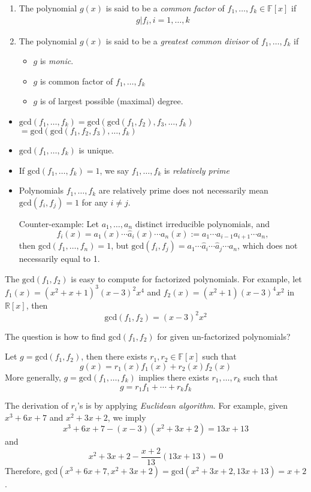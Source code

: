 \begin{definition}
\begin{enumerate}
\item
The polynomial $g(x)$ is said to be a \emph{common factor} of $f_1,\dots,f_k\in\mathbb{F}[x]$ if
\[
\begin{array}{ll}
g|f_i,
i=1,\dots,k
\end{array}
\]
\item
The polynomial $g(x)$ is said to be a \emph{greatest common divisor} of $f_1,\dots,f_k$ if
\begin{itemize}
\item
$g$ is \emph{monic}.
\item
$g$ is common factor of $f_1,\dots,f_k$
\item
$g$ is of largest possible (maximal) degree.
\end{itemize} 
\end{enumerate}
\end{definition}

\begin{remark}
\begin{itemize}
\item
$\text{gcd}(f_1,\dots,f_k) = \text{gcd}(\text{gcd}(f_1,f_2),f_3,\dots,f_k)$
$=\text{gcd}(\text{gcd}(f_1,f_2,f_3),\dots,f_k)$
\item
$\text{gcd}(f_1,\dots,f_k)$ is unique.
\item
If $\text{gcd}(f_1,\dots,f_k)=1$, we say $f_1,\dots,f_k$ is \emph{relatively prime}
\item
Polynomials $f_1,\dots,f_k$ are relatively prime does not necessarily mean $\text{gcd}(f_i,f_j)=1$ for any $i\ne j$.

Counter-example:
Let $a_1,\dots,a_n$ distinct irreducible polynomials, and
\[
f_i(x) = a_1(x)\cdots \hat{a}_i(x)\cdots a_n(x):=a_1\cdots a_{i-1}a_{i+1}\cdots a_n,
\]
then $\text{gcd}(f_1,\dots,f_n)=1$, but $\text{gcd}(f_i,f_j) = a_1\cdots\hat{a}_i\cdots\hat{a}_j\cdots a_n$, which does not necessarily equal to 1.
\end{itemize}
\end{remark}
\begin{example}
The $\text{gcd}(f_1,f_2)$ is easy to compute for factorized polynomials. For example, let $f_1(x) = (x^2+x+1)^3(x-3)^2x^4$ and
$f_2(x)=(x^2+1)(x-3)^4x^2$ in $\mathbb{R}[x]$, then
\[
\text{gcd}(f_1,f_2) = (x-3)^2x^2
\]
\end{example}
The question is how to find $\text{gcd}(f_1,f_2)$ for given un-factorized polynomials? 
\begin{theorem}[Bezout]\label{The:6:7}
Let $g = \text{gcd}(f_1,f_2)$, then there exists $r_1,r_2\in\mathbb{F}[x]$ such that
\[
g(x)  =r_1(x)f_1(x)+r_2(x)f_2(x)
\]
More generally, $g=\text{gcd}(f_1,\dots,f_k)$ implies there exists $r_1,\dots,r_k$ such that 
\[
g = r_1f_1+\cdots+r_kf_k
\]
\end{theorem}
The derivation of $r_i$'s is by applying \emph{Euclidean algorithm}. For example, given $x^3+6x+7$ and $x^2+3x+2$, we imply 
\[
x^3+6x+7 - (x-3)(x^2+3x+2) = 13x+13
\]
and
\[
x^2+3x+2 - \frac{x+2}{13}(13x+13)=0
\]
Therefore, $\text{gcd}(x^3+6x+7,x^2+3x+2) = \text{gcd}(x^2+3x+2,13x+13)=x+2$.

